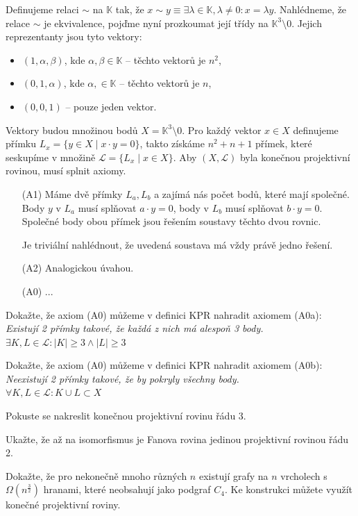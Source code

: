 \begin{t_proof}
  Definujeme relaci $\sim$ na $\mathbb{K}$ tak, že $x\sim y\equiv \exists\lambda\in\mathbb{K}, \lambda\neq 0:x=\lambda y$. Nahlédneme, že relace $\sim$ je ekvivalence, pojďme nyní prozkoumat její třídy na $\mathbb{K}^3\setminus 0$. Jejich reprezentanty jsou tyto vektory:
  \begin{itemize}
    \item $(1,\alpha,\beta)$, kde $\alpha,\beta\in\mathbb{K}$ – těchto vektorů je $n^2$,
    \item $(0,1,\alpha)$, kde $\alpha,\in\mathbb{K}$ – těchto vektorů je $n$,
    \item $(0,0,1)$ – pouze jeden vektor.
  \end{itemize}
  
  Vektory budou množinou bodů $X=\mathbb{K}^3\setminus 0$. Pro každý vektor $x\in X$ definujeme přímku $L_x=\{y\in X\mid x\cdot y=0\}$, takto získáme $n^2+n+1$ přímek, které seskupíme v množině $\mathcal{L}=\{L_x\mid x\in X\}$. Aby $(X,\mathcal{L})$ byla konečnou projektivní rovinou, musí splnit axiomy.
  \begin{enumerate}
    \item[(A1)] Máme dvě přímky $L_a, L_b$ a zajímá nás počet bodů, které mají společné. Body $y$ v $L_a$ musí splňovat $a\cdot y=0$, body v $L_b$ musí splňovat $b\cdot y=0$. Společné body obou přímek jsou řešením soustavy těchto dvou rovnic.
    
    Je triviální nahlédnout, že uvedená soustava má vždy právě jedno řešení.
    
    \item[(A2)] Analogickou úvahou.
    
    \item[(A0)] ... %
  \end{enumerate}
\end{t_proof}

\begin{t_exercise}
  \item Dokažte, že axiom (A0) můžeme v definici KPR nahradit axiomem (A0a):\\
  \textit{Existují 2 přímky takové, že každá z nich má alespoň 3 body.}
  \\$\exists K, L\in\mathcal{L}:|K|\geq 3\wedge|L|\geq 3$
  
  \item Dokažte, že axiom (A0) můžeme v definici KPR nahradit axiomem (A0b):\\
  \textit{Neexistují 2 přímky takové, že by pokryly všechny body.}
  \\$\forall K, L\in\mathcal{L}:K\cup L\subset X$
  
  \item Pokuste se nakreslit konečnou projektivní rovinu řádu 3.
  
  \item Ukažte, že až na isomorfismus je Fanova rovina jedinou projektivní rovinou řádu 2.
  
  \item Dokažte, že pro nekonečně mnoho různých $n$ existují grafy na $n$ vrcholech s $\Omega(n^\frac{3}{2})$ hranami, které neobsahují jako podgraf $C_4$. Ke konstrukci můžete využít konečné projektivní roviny.
\end{t_exercise}
